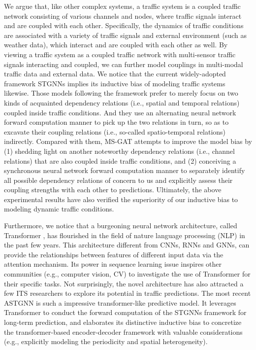 We argue that, like other complex systems, a traffic system is a coupled traffic network consisting of various channels and nodes, where traffic signals interact and are coupled with each other. Specifically, the dynamics of traffic conditions are associated with a variety of traffic signals and external environment (such as weather data), which interact and are coupled with each other as well. By viewing a traffic system as a coupled traffic network with multi-sensor traffic signals interacting and coupled, we can further model couplings in multi-modal traffic data and external data. We notice that the current widely-adopted framework STGNNs implies its inductive bias of modeling traffic systems likewise. Those models following the framework prefer to merely focus on two kinds of acquainted dependency relations (i.e., spatial and temporal relations) coupled inside traffic conditions. And they use an alternating neural network forward computation manner to pick up the two relations in turn, so as to excavate their coupling relations (i.e., so-called spatio-temporal relations) indirectly. Compared with them, MS-GAT attempts to improve the model bias by (1) shedding light on another noteworthy dependency relations (i.e., channel relations) that are also coupled inside traffic conditions, and (2) conceiving a synchronous neural network forward computation manner to separately identify all possible dependency relations of concern to us and explicitly assess their coupling strengths with each other to predictions. Ultimately, the above experimental results have also verified the superiority of our inductive bias to modeling dynamic traffic conditions. 

Furthermore, we notice that a burgeoning neural network architecture, called Transformer \cite{vaswani2017attention}, has flourished in the field of nature language processing (NLP) in the past few years. This architecture different from CNNs, RNNs and GNNs, can provide the relationships between features of different input data via the attention mechanism. Its power in sequence learning issue inspires other communities (e.g., computer vision, CV) to investigate the use of Transformer for their specific tasks. Not surprisingly, the novel architecture has also attracted a few ITS researchers to explore its potential in traffic predictions. The most recent ASTGNN \cite{2021Learning} is such a impressive transformer-like predictive model. It leverages Transformer to conduct the forward computation of the STGNNs framework for long-term prediction, and elaborates its distinctive inductive bias to concretize the transformer-based encoder-decoder framework with valuable considerations (e.g., explicitly modeling the periodicity and spatial heterogeneity). 

